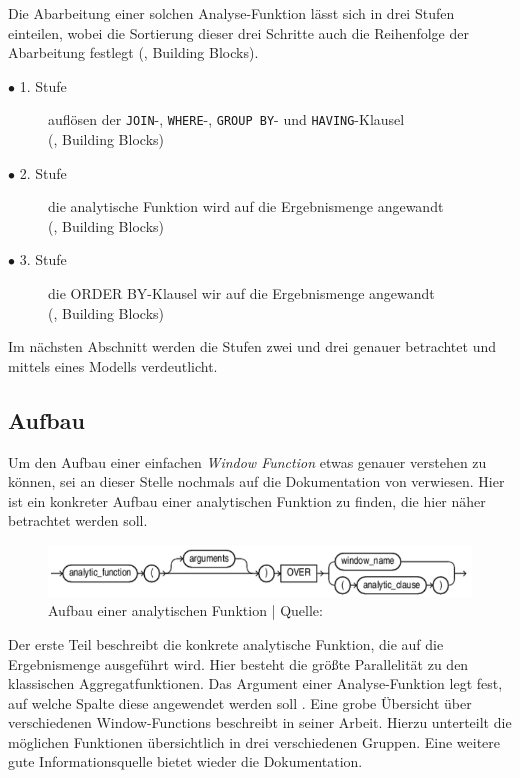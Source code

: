 Die Abarbeitung einer solchen Analyse-Funktion lässt sich in drei Stufen einteilen,
wobei die Sortierung dieser drei Schritte auch die Reihenfolge der Abarbeitung
festlegt (\cite{Nuijten2023}, Building Blocks).
\begin{description}
	\item[$\bullet$ 1. Stufe] auflösen der \texttt{JOIN}-, \texttt{WHERE}-, \texttt{GROUP
		BY}- und \texttt{HAVING}-Klausel \\ (\cite{Nuijten2023}, Building Blocks)

	\item[$\bullet$ 2. Stufe] die analytische Funktion wird auf die Ergebnismenge angewandt
		\\ (\cite{Nuijten2023}, Building Blocks)

	\item[$\bullet$ 3. Stufe] die ORDER BY-Klausel wir auf die Ergebnismenge angewandt
		\\ (\cite{Nuijten2023}, Building Blocks)
\end{description}
Im nächsten Abschnitt werden die Stufen zwei und drei genauer betrachtet und
mittels eines Modells verdeutlicht.

\subsection{Aufbau}
\label{sec:aufbau} Um den Aufbau einer einfachen \textit{Window Function} etwas genauer
verstehen zu können, sei an dieser Stelle nochmals auf die Dokumentation von
\citet{oracle} verwiesen. Hier ist ein konkreter Aufbau einer analytischen
Funktion zu finden, die hier näher betrachtet werden soll.
\begin{figure}[h]
	\centering
	\includegraphics[scale=0.5]{img/aufbauAnalyticFunction.jpg}
	\caption{ Aufbau einer analytischen Funktion | Quelle: \citep{oracle}}
	\label{fig:aufbauAnalyticFunction}
\end{figure}
Der erste Teil beschreibt die konkrete analytische Funktion, die auf die Ergebnismenge
ausgeführt wird. Hier besteht die größte Parallelität zu den klassischen
Aggregatfunktionen. Das Argument einer Analyse-Funktion legt fest, auf welche
Spalte diese angewendet werden soll \citep[S.~110]{schicker2017datenbanken}.
Eine grobe Übersicht über verschiedenen Window-Functions beschreibt \citet[]{ibrahaim23}
in seiner Arbeit. Hierzu unterteilt die möglichen Funktionen übersichtlich in
drei verschiedenen Gruppen. Eine weitere gute Informationsquelle bietet wieder die
\citet{oracle} Dokumentation.

